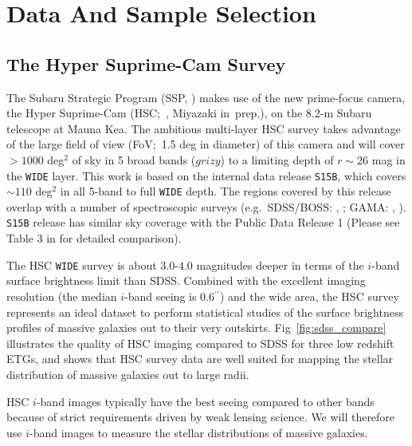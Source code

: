 \documentclass[a4paper,fleqn,usenatbib]{mnras}
\def\asec{$^{\prime\prime}$}
\begin{document}
\section{Data And Sample Selection}
    \label{sec:data}

\subsection{The Hyper Suprime-Cam Survey}
    \label{ssec:hsc}

    The Subaru Strategic Program (SSP, \citealt{HSC_SSP, HSC_DR1}) makes use of the 
    new prime-focus camera, the Hyper Suprime-Cam (HSC;~\citealt{Miyazaki2012}, 
    Miyazaki in~prep.), on the 
    8.2-m Subaru telescope at Mauna Kea. 
    The ambitious multi-layer HSC survey takes advantage of the large field of 
    view (FoV;~1.5 deg in diameter) of this camera and will cover $>1000$ deg$^2$ 
    of sky in 5 broad bands ($grizy$) to a limiting depth of $r {\sim} 26$ mag 
    in the \texttt{WIDE} layer. 
    This work is based on the internal data release \texttt{S15B}, which covers 
    ${\sim} 110$ deg$^2$ in all 5-band to full \texttt{WIDE} depth.  
    The regions covered by this release overlap with a number of spectroscopic surveys 
    (e.g.\ SDSS/BOSS: \citealt{Eisenstein2011}, \citealt{Alam2015}; 
    GAMA: \citealt{Driver2011}, \citealt{Liske2015}).
    \texttt{S15B} release has similar sky coverage with the Public Data Release 1
    (Please see Table 3 in \citealt{HSC_DR1} for detailed comparison).

    The HSC \texttt{WIDE} survey is about $3.0$-$4.0$ magnitudes deeper in terms of 
    the $i$-band surface brightness limit than SDSS. 
    Combined with the excellent imaging resolution (the median $i$-band seeing is 
    0.6\asec) and the wide area, the HSC survey represents an ideal dataset to perform 
    statistical studies of the surface brightness profiles of massive galaxies out to 
    their very outskirts.  
    Fig~\ref{fig:sdss_compare} illustrates the quality of HSC imaging compared to SDSS 
    for three low redshift ETGs, and shows that HSC survey data are well suited for 
    mapping the stellar distribution of massive galaxies out to large radii.

	HSC $i$-band images typically have the best seeing compared to other bands because 
	of strict requirements driven by weak lensing science. 
    We will therefore use $i$-band images to measure the stellar distributions of 
    massive galaxies.
    
\end{document}

